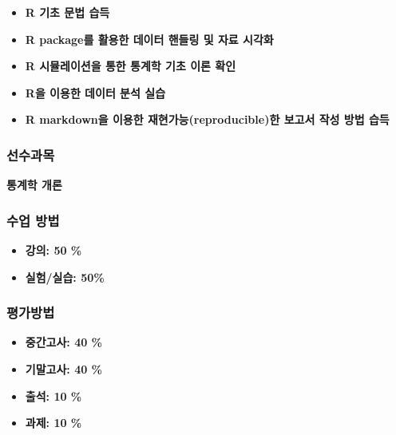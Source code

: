 \documentclass[
  11pt,
]{krantz}
\makeatletter
\providecommand{\tightlist}{%
  \setlength{\itemsep}{0pt}\setlength{\parskip}{0pt}}
\newenvironment{kframe}{%
\medskip{}
\setlength{\fboxsep}{.8em}
 \def\at@end@of@kframe{}%
 \ifinner\ifhmode%
  \def\at@end@of@kframe{\end{minipage}}%
  \begin{minipage}{\columnwidth}%
 \fi\fi%
 \def\FrameCommand##1{\hskip\@totalleftmargin \hskip-\fboxsep
 \colorbox{shadecolor}{##1}\hskip-\fboxsep
     \hskip-\linewidth \hskip-\@totalleftmargin \hskip\columnwidth}%
 \MakeFramed {\advance\hsize-\width
   \@totalleftmargin\z@ \linewidth\hsize
   \@setminipage}}%
 {\par\unskip\endMakeFramed%
 \at@end@of@kframe}
\renewenvironment{quote}{\begin{kframe}}{\end{kframe}}
\makeatother
\begin{document}
\begin{quote}
\begin{itemize}
\tightlist
\item
  \textbf{R 기초 문법 습득}
\item
  \textbf{R package를 활용한 데이터 핸들링 및 자료 시각화}
\item
  \textbf{R 시뮬레이션을 통한 통계학 기초 이론 확인}
\item
  \textbf{R을 이용한 데이터 분석 실습}
\item
  \textbf{R markdown을 이용한 재현가능(reproducible)한 보고서 작성 방법 습득}
\end{itemize}
\end{quote}

\hypertarget{pre-course}{%
\subsubsection*{선수과목}\label{pre-course}}


\begin{quote}
\textbf{통계학 개론}
\end{quote}

\hypertarget{course-method}{%
\subsubsection*{수업 방법}\label{course-method}}


\begin{itemize}
\tightlist
\item
  \textbf{강의: 50 \%}
\item
  \textbf{실험/실습: 50\%}
\end{itemize}

\hypertarget{grade-method}{%
\subsubsection*{평가방법}\label{grade-method}}


\begin{quote}
\begin{itemize}
\tightlist
\item
  \textbf{중간고사: 40 \%}
\item
  \textbf{기말고사: 40 \%}
\item
  \textbf{출석: 10 \%}
\item
  \textbf{과제: 10 \%}
\end{itemize}
\end{quote}
\end{document}

